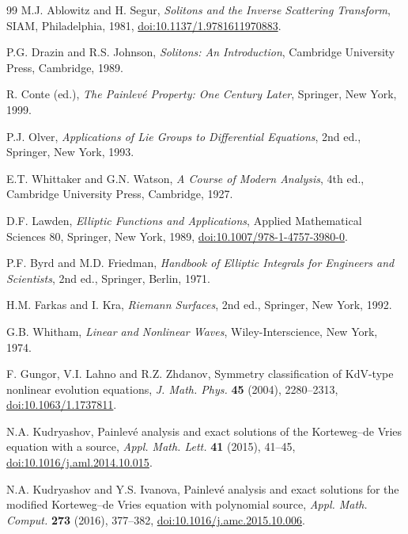\documentclass[11pt]{article}
\begin{document}
\begin{thebibliography}{99}
M.J. Ablowitz and H. Segur, \emph{Solitons and the Inverse Scattering Transform}, SIAM, Philadelphia, 1981, \href{https://doi.org/10.1137/1.9781611970883}{doi:10.1137/1.9781611970883}.

P.G. Drazin and R.S. Johnson, \emph{Solitons: An Introduction}, Cambridge University Press, Cambridge, 1989.

R. Conte (ed.), \emph{The Painlev\'e Property: One Century Later}, Springer, New York, 1999.

P.J. Olver, \emph{Applications of Lie Groups to Differential Equations}, 2nd ed., Springer, New York, 1993.

E.T. Whittaker and G.N. Watson, \emph{A Course of Modern Analysis}, 4th ed., Cambridge University Press, Cambridge, 1927.

D.F. Lawden, \emph{Elliptic Functions and Applications}, Applied Mathematical Sciences 80, Springer, New York, 1989, \href{https://doi.org/10.1007/978-1-4757-3980-0}{doi:10.1007/978-1-4757-3980-0}.

P.F. Byrd and M.D. Friedman, \emph{Handbook of Elliptic Integrals for Engineers and Scientists}, 2nd ed., Springer, Berlin, 1971.

H.M. Farkas and I. Kra, \emph{Riemann Surfaces}, 2nd ed., Springer, New York, 1992.

G.B. Whitham, \emph{Linear and Nonlinear Waves}, Wiley-Interscience, New York, 1974.

F. Gungor, V.I. Lahno and R.Z. Zhdanov, Symmetry classification of KdV-type nonlinear evolution equations, \emph{J. Math. Phys.} \textbf{45} (2004), 2280--2313, \href{https://doi.org/10.1063/1.1737811}{doi:10.1063/1.1737811}.

N.A. Kudryashov, Painlev\'e analysis and exact solutions of the Korteweg--de Vries equation with a source, \emph{Appl. Math. Lett.} \textbf{41} (2015), 41--45, \href{https://doi.org/10.1016/j.aml.2014.10.015}{doi:10.1016/j.aml.2014.10.015}.

N.A. Kudryashov and Y.S. Ivanova, Painlev\'e analysis and exact solutions for the modified Korteweg--de Vries equation with polynomial source, \emph{Appl. Math. Comput.} \textbf{273} (2016), 377--382, \href{https://doi.org/10.1016/j.amc.2015.10.006}{doi:10.1016/j.amc.2015.10.006}.
\end{thebibliography}
\end{document}
